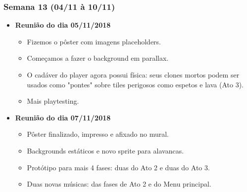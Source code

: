 \documentclass[a4paper, 11pt]{article}
\begin{document}
\subsubsection{Semana 13 (04/11 à 10/11)}
	\begin{itemize} 
		\item \textbf{Reunião do dia 05/11/2018}

		\begin{itemize}

    		\item Fizemos o pôster com imagens placeholders.
    		\item Começamos a fazer o background em parallax.
    		\item O cadáver do player agora possui física: seus clones mortos podem ser usados como "pontes" sobre tiles perigosos como espetos e lava (Ato 3).
    		\item Mais playtesting.

   		\end{itemize}

		\item \textbf{Reunião do dia 07/11/2018}

		\begin{itemize}

    		\item Pôster finalizado, impresso e afixado no mural.
    		\item Backgrounds estáticos e novo sprite para alavancas.
    		\item Protótipo para mais 4 fases: duas do Ato 2 e duas do Ato 3.
    		\item Duas novas músicas: das fases de Ato 2 e do Menu principal.

		\end{itemize}

	\end{itemize}
\end{document}
